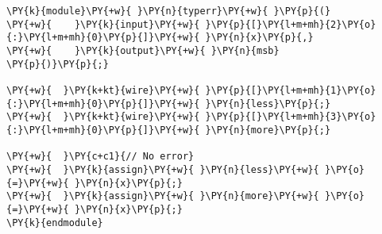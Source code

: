 \begin{Verbatim}[commandchars=\\\{\}]
\PY{k}{module}\PY{+w}{ }\PY{n}{typerr}\PY{+w}{ }\PY{p}{(}
\PY{+w}{    }\PY{k}{input}\PY{+w}{ }\PY{p}{[}\PY{l+m+mh}{2}\PY{o}{:}\PY{l+m+mh}{0}\PY{p}{]}\PY{+w}{ }\PY{n}{x}\PY{p}{,}
\PY{+w}{    }\PY{k}{output}\PY{+w}{ }\PY{n}{msb}
\PY{p}{)}\PY{p}{;}

\PY{+w}{  }\PY{k+kt}{wire}\PY{+w}{ }\PY{p}{[}\PY{l+m+mh}{1}\PY{o}{:}\PY{l+m+mh}{0}\PY{p}{]}\PY{+w}{ }\PY{n}{less}\PY{p}{;}
\PY{+w}{  }\PY{k+kt}{wire}\PY{+w}{ }\PY{p}{[}\PY{l+m+mh}{3}\PY{o}{:}\PY{l+m+mh}{0}\PY{p}{]}\PY{+w}{ }\PY{n}{more}\PY{p}{;}

\PY{+w}{  }\PY{c+c1}{// No error}
\PY{+w}{  }\PY{k}{assign}\PY{+w}{ }\PY{n}{less}\PY{+w}{ }\PY{o}{=}\PY{+w}{ }\PY{n}{x}\PY{p}{;}
\PY{+w}{  }\PY{k}{assign}\PY{+w}{ }\PY{n}{more}\PY{+w}{ }\PY{o}{=}\PY{+w}{ }\PY{n}{x}\PY{p}{;}
\PY{k}{endmodule}
\end{Verbatim}
